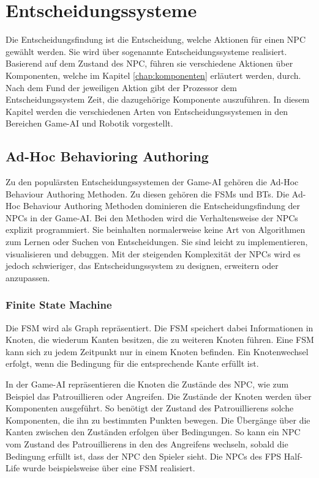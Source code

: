 \chapter{Entscheidungssysteme}
\label{chap:entscheidungssysteme}

Die Entscheidungsfindung ist die Entscheidung, welche Aktionen f\"{u}r einen NPC gew\"{a}hlt werden. Sie wird \"{u}ber sogenannte Entscheidungssysteme realisiert. Basierend auf dem Zustand des NPC, f\"{u}hren sie verschiedene Aktionen \"{u}ber Komponenten, welche im Kapitel \ref{chap:komponenten} erläutert werden, durch. Nach dem Fund der jeweiligen Aktion gibt der Prozessor dem Entscheidungssystem Zeit, die dazugeh\"{o}rige Komponente auszuf\"{u}hren. In diesem Kapitel werden die verschiedenen Arten von Entscheidungssystemen in den Bereichen Game-AI und Robotik vorgestellt.

\section{Ad-Hoc Behavioring Authoring}
\label{chap:ahba}

Zu den popul\"{a}rsten Entscheidungssystemen der Game-AI geh\"{o}ren die Ad-Hoc Behaviour Authoring Methoden. Zu diesen geh\"{o}ren die FSMs und BTs. Die Ad-Hoc Behaviour Authoring Methoden dominieren die Entscheidungsfindung der NPCs in der Game-AI. Bei den Methoden wird die Verhaltensweise der NPCs explizit programmiert. Sie beinhalten normalerweise keine Art von Algorithmen zum Lernen oder Suchen von Entscheidungen. Sie sind leicht zu implementieren, visualisieren und debuggen. Mit der steigenden Komplexit\"{a}t der NPCs wird es jedoch schwieriger, das Entscheidungssystem zu designen, erweitern oder anzupassen. \autocite{aiag, review_game_ai}

\subsection{Finite State Machine}
\label{chap:fsm}

Die FSM wird als Graph repr\"{a}sentiert. Die FSM speichert dabei Informationen in Knoten, die wiederum Kanten besitzen, die zu weiteren Knoten f\"{u}hren. Eine FSM kann sich zu jedem Zeitpunkt nur in einem Knoten befinden. Ein Knotenwechsel erfolgt, wenn die Bedingung f\"{u}r die entsprechende Kante erf\"{u}llt ist. 

In der Game-AI repr\"{a}sentieren die Knoten die Zust\"{a}nde des NPC, wie zum Beispiel das Patrouillieren oder Angreifen. Die Zust\"{a}nde der Knoten werden \"{u}ber Komponenten ausgef\"{u}hrt. So ben\"{o}tigt der Zustand des Patrouillierens solche Komponenten, die ihn zu bestimmten Punkten bewegen. Die \"{U}berg\"{a}nge \"{u}ber die Kanten zwischen den Zust\"{a}nden erfolgen \"{u}ber Bedingungen. So kann ein NPC vom Zustand des Patrouillierens in den des Angreifens wechseln, sobald die Bedingung erf\"{u}llt ist, dass der NPC den Spieler sieht. Die NPCs des FPS Half-Life wurde beispielsweise \"{u}ber eine FSM realisiert. \autocite{AIgames}

